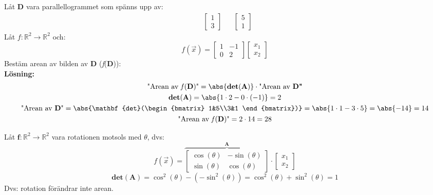 \begin{Ex}
	Låt \textbf{D} vara parallellogrammet som spänns upp av:
	\begin{align*}
	&\begin{bmatrix} 1\\3 \end{bmatrix}
	&&\begin{bmatrix} 5\\1 \end{bmatrix}
	\end{align*}
	Låt $f: \mathbb{R}^2 \rightarrow \mathbb{R}^2$ och:
	\[
	f(\vec{x}) = \begin{bmatrix} 1&-1\\0&2 \end{bmatrix}\begin{bmatrix} x_1\\x_2 \end{bmatrix}
	\]
	Bestäm arean av bilden av \textbf{D} (\textit{f}(\textbf{D})):\\
	\textbf{Lösning:}
	\begin{gather*}
		\mbox{"Arean av \textit{f}(\textbf{D})"} = \abs{\mathbf{det}(\mathbf{A})} \cdot \mbox{"Arean av \textbf{D"}}\\
		\mathbf{det}(\mathbf{A}) = \abs{1 \cdot 2 - 0 \cdot (-1)} = 2\\
		\mbox{"Arean av \textbf{D}"} = \abs{\mathbf{det}(\begin{bmatrix} 1&5\\3&1 \end{bmatrix})} = \abs{1 \cdot 1 - 3 \cdot 5} = \abs{-14} = 14\\
		\mbox{"Arean av \textit{f}(\textbf{D})"} = 2 \cdot 14 = 28
	\end{gather*}
\end{Ex}
\begin{Ex}
	Låt $\mathbf{f}: \mathbb{R}^2 \rightarrow \mathbb{R}^2$ vara rotationen motsols med $\theta$, dvs:
	\[
	f(\vec{x}) = \overbrace{\begin{bmatrix} \cos(\theta) & -\sin(\theta)\\\sin(\theta)&\cos(\theta) \end{bmatrix}}^{\mathbf{A}} \cdot \begin{bmatrix} x_1\\x_2 \end{bmatrix}
	\]
	\[
	\mathbf{det}(\mathbf{A}) = \cos^2(\theta) -(-\sin^2(\theta)) = \cos^2(\theta) + \sin^2(\theta) = 1
	\]
	Dvs: rotation förändrar inte arean.
\end{Ex}











